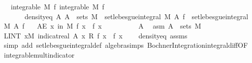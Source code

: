 \begin{isabellebody}
\ \ \ {\isachardoublequoteopen}integrable\ M\ f{\isachardoublequoteclose}\ {\isachardoublequoteopen}integrable\ M\ f{\isacharprime}{\kern0pt}{\isachardoublequoteclose}\isanewline
\ \ \ \ \ \ \ density{\isacharunderscore}{\kern0pt}eq{\isacharcolon}{\kern0pt}\ {\isachardoublequoteopen}{\isasymAnd}A{\isachardot}{\kern0pt}\ A\ {\isasymin}\ sets\ M\ {\isasymLongrightarrow}\ set{\isacharunderscore}{\kern0pt}lebesgue{\isacharunderscore}{\kern0pt}integral\ M\ A\ f\ {\isacharequal}{\kern0pt}\ set{\isacharunderscore}{\kern0pt}lebesgue{\isacharunderscore}{\kern0pt}integral\ M\ A\ f{\isacharprime}{\kern0pt}{\isachardoublequoteclose}\isanewline
\ \ \ {\isachardoublequoteopen}AE\ x\ in\ M{\isachardot}{\kern0pt}\ f\ x\ {\isacharequal}{\kern0pt}\ f{\isacharprime}{\kern0pt}\ x{\isachardoublequoteclose}\isanewline
%
\isadelimproof
%
\endisadelimproof
%
\isatagproof
{}\isamarkupfalse%
{\isacharminus}{\kern0pt}\isanewline
\ \ \isacommand{{\isacharbraceleft}{\kern0pt}}\isamarkupfalse%
\ \isanewline
\ \ \ \ \isamarkupfalse%
\ A\ \isamarkupfalse%
\ asm{\isacharcolon}{\kern0pt}\ {\isachardoublequoteopen}A\ {\isasymin}\ sets\ M{\isachardoublequoteclose}\isanewline
\ \ \ \ \isamarkupfalse%
\ {\isachardoublequoteopen}LINT\ x{\isacharbar}{\kern0pt}M{\isachardot}{\kern0pt}\ indicat{\isacharunderscore}{\kern0pt}real\ A\ x\ {\isacharasterisk}{\kern0pt}\isactrlsub R\ {\isacharparenleft}{\kern0pt}f\ x\ {\isacharminus}{\kern0pt}\ f{\isacharprime}{\kern0pt}\ x{\isacharparenright}{\kern0pt}\ {\isacharequal}{\kern0pt}\ {}{\isachardoublequoteclose}\ \isamarkupfalse%
\ density{\isacharunderscore}{\kern0pt}eq\ assms{\isacharparenleft}{\kern0pt}{}{\isacharcomma}{\kern0pt}{}{\isacharparenright}{\kern0pt}\ \isamarkupfalse%
\ {\isacharparenleft}{\kern0pt}simp\ add{\isacharcolon}{\kern0pt}\ set{\isacharunderscore}{\kern0pt}lebesgue{\isacharunderscore}{\kern0pt}integral{\isacharunderscore}{\kern0pt}def\ algebra{\isacharunderscore}{\kern0pt}simps\ Bochner{\isacharunderscore}{\kern0pt}Integration{\isachardot}{\kern0pt}integral{\isacharunderscore}{\kern0pt}diff{\isacharbrackleft}{\kern0pt}OF\ integrable{\isacharunderscore}{\kern0pt}mult{\isacharunderscore}{\kern0pt}indicator{\isacharparenleft}{\kern0pt}{}{\isacharcomma}{\kern0pt}{}{\isacharparenright}{\kern0pt}{\isacharbrackright}{\kern0pt}{\isacharparenright}{\kern0pt}\isanewline
\ \ \isacommand{{\isacharbraceright}{\kern0pt}}\isamarkupfalse%

\end{isabellebody}
